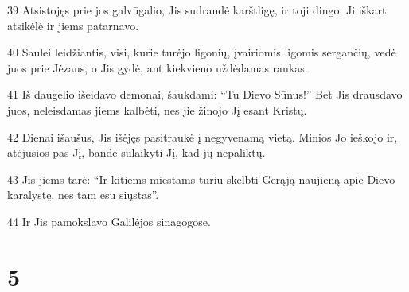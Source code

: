 \par 39 Atsistojęs prie jos galvūgalio, Jis sudraudė karštligę, ir toji dingo. Ji iškart atsikėlė ir jiems patarnavo. 
\par 40 Saulei leidžiantis, visi, kurie turėjo ligonių, įvairiomis ligomis sergančių, vedė juos prie Jėzaus, o Jis gydė, ant kiekvieno uždėdamas rankas. 
\par 41 Iš daugelio išeidavo demonai, šaukdami: “Tu Dievo Sūnus!” Bet Jis drausdavo juos, neleisdamas jiems kalbėti, nes jie žinojo Jį esant Kristų. 
\par 42 Dienai išaušus, Jis išėjęs pasitraukė į negyvenamą vietą. Minios Jo ieškojo ir, atėjusios pas Jį, bandė sulaikyti Jį, kad jų nepaliktų. 
\par 43 Jis jiems tarė: “Ir kitiems miestams turiu skelbti Gerąją naujieną apie Dievo karalystę, nes tam esu siųstas”. 
\par 44 Ir Jis pamokslavo Galilėjos sinagogose.



\chapter{5}


